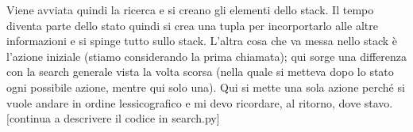 \documentclass[a4paper, 11pt]{article}
\begin{document}
Viene avviata quindi la ricerca e si creano gli elementi dello stack. Il tempo diventa parte dello stato quindi si crea una tupla per incorportarlo alle altre informazioni e si spinge tutto sullo stack. L'altra cosa che va messa nello stack è l'azione iniziale (stiamo considerando la prima chiamata); qui sorge una differenza con la search generale vista la volta scorsa (nella quale si metteva dopo lo stato ogni possibile azione, mentre qui solo una). Qui si mette una sola azione perché si vuole andare in ordine lessicografico e mi devo ricordare, al ritorno, dove stavo. [continua a descrivere il codice in search.py]
\end{document}
